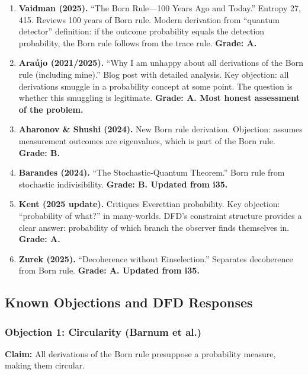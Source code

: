 \documentclass[11pt,a4paper]{article}
\begin{document}
\begin{enumerate}
\item \textbf{Vaidman (2025).} ``The Born Rule---100 Years Ago and Today.'' Entropy 27, 415. Reviews 100 years of Born rule. Modern derivation from ``quantum detector'' definition: if the outcome probability equals the detection probability, the Born rule follows from the trace rule. \textbf{Grade: A.}

\item \textbf{Ara\'ujo (2021/2025).} ``Why I am unhappy about all derivations of the Born rule (including mine).'' Blog post with detailed analysis. Key objection: all derivations smuggle in a probability concept at some point. The question is whether this smuggling is legitimate. \textbf{Grade: A. Most honest assessment of the problem.}

\item \textbf{Aharonov \& Shushi (2024).} New Born rule derivation. Objection: assumes measurement outcomes are eigenvalues, which is part of the Born rule. \textbf{Grade: B.}

\item \textbf{Barandes (2024).} ``The Stochastic-Quantum Theorem.'' Born rule from stochastic indivisibility. \textbf{Grade: B. Updated from i35.}

\item \textbf{Kent (2025 update).} Critiques Everettian probability. Key objection: ``probability of what?'' in many-worlds. DFD's constraint structure provides a clear answer: probability of which branch the observer finds themselves in. \textbf{Grade: A.}

\item \textbf{Zurek (2025).} ``Decoherence without Einselection.'' Separates decoherence from Born rule. \textbf{Grade: A. Updated from i35.}
\end{enumerate}

\subsection{Known Objections and DFD Responses}

\subsubsection{Objection 1: Circularity (Barnum et al.)}

\textbf{Claim:} All derivations of the Born rule presuppose a probability measure, making them circular.
\end{document}
